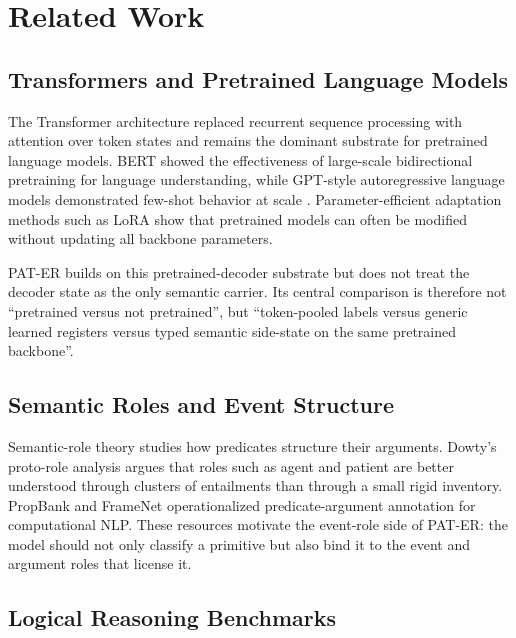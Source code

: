 \section{Related Work}
\label{sec:related}

\subsection{Transformers and Pretrained Language Models}

The Transformer architecture \citep{vaswani2017attention} replaced recurrent
sequence processing with attention over token states and remains the dominant
substrate for pretrained language models. BERT \citep{devlin2019bert} showed
the effectiveness of large-scale bidirectional pretraining for language
understanding, while GPT-style autoregressive language models demonstrated
few-shot behavior at scale \citep{brown2020language}. Parameter-efficient
adaptation methods such as LoRA \citep{hu2022lora} show that pretrained models
can often be modified without updating all backbone parameters.

PAT-ER builds on this pretrained-decoder substrate but does not treat the
decoder state as the only semantic carrier. Its central comparison is therefore
not ``pretrained versus not pretrained'', but ``token-pooled labels versus
generic learned registers versus typed semantic side-state on the same
pretrained backbone''.



\subsection{Semantic Roles and Event Structure}

Semantic-role theory studies how predicates structure their arguments. Dowty's
proto-role analysis \citep{dowty1991proto} argues that roles such as agent and
patient are better understood through clusters of entailments than through a
small rigid inventory. PropBank \citep{palmer2005propbank} and FrameNet
\citep{baker1998framenet} operationalized predicate-argument annotation for
computational NLP. These resources motivate the event-role side of PAT-ER: the
model should not only classify a primitive but also bind it to the event and
argument roles that license it.

\subsection{Logical Reasoning Benchmarks}

